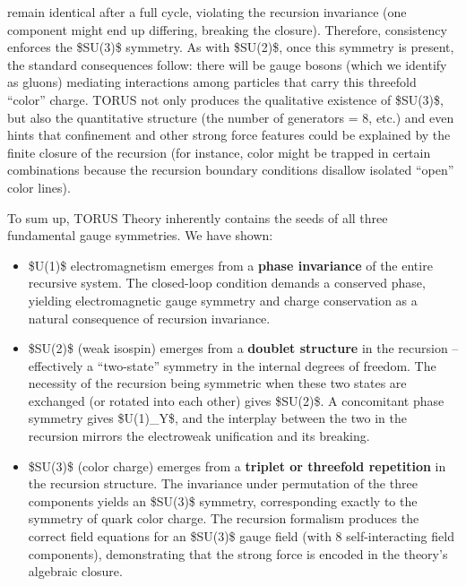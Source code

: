 \documentclass[]{article}
\begin{document}
\begin{itemize}
  remain identical after a full cycle, violating the recursion
  invariance (one component might end up differing, breaking the
  closure). Therefore, consistency enforces the \$SU(3)\$ symmetry​. As
  with \$SU(2)\$, once this symmetry is present, the standard
  consequences follow: there will be gauge bosons (which we identify as
  gluons) mediating interactions among particles that carry this
  threefold ``color'' charge. TORUS not only produces the qualitative
  existence of \$SU(3)\$, but also the quantitative structure (the
  number of generators = 8, etc.) and even hints that confinement and
  other strong force features could be explained by the finite closure
  of the recursion (for instance, color might be trapped in certain
  combinations because the recursion boundary conditions disallow
  isolated ``open'' color lines).
\end{itemize}

To sum up, TORUS Theory inherently contains the seeds of all three
fundamental gauge symmetries. We have shown:

\begin{itemize}
\item
  \$U(1)\$ electromagnetism emerges from a \textbf{phase invariance} of
  the entire recursive system. The closed-loop condition demands a
  conserved phase, yielding electromagnetic gauge symmetry and charge
  conservation as a natural consequence of recursion invariance.
\item
  \$SU(2)\$ (weak isospin) emerges from a \textbf{doublet structure} in
  the recursion -- effectively a ``two-state'' symmetry in the internal
  degrees of freedom​. The necessity of the recursion being symmetric
  when these two states are exchanged (or rotated into each other) gives
  \$SU(2)\$. A concomitant phase symmetry gives \$U(1)\_Y\$, and the
  interplay between the two in the recursion mirrors the electroweak
  unification and its breaking​.
\item
  \$SU(3)\$ (color charge) emerges from a \textbf{triplet or threefold
  repetition} in the recursion structure​. The invariance under
  permutation of the three components yields an \$SU(3)\$ symmetry,
  corresponding exactly to the symmetry of quark color charge. The
  recursion formalism produces the correct field equations for an
  \$SU(3)\$ gauge field (with 8 self-interacting field components),
  demonstrating that the strong force is encoded in the theory's
  algebraic closure​.
\end{itemize}
\end{document}
